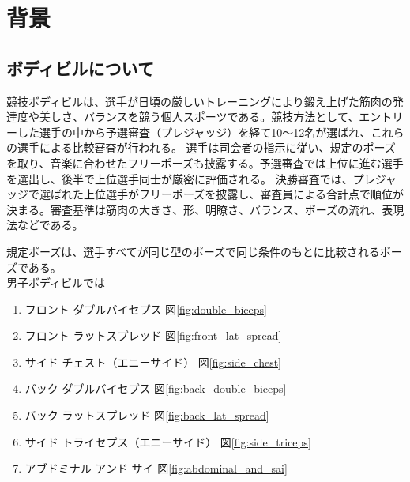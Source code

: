 \chapter{背景}
\label{background}
\section{ボディビルについて}

競技ボディビルは、選手が日頃の厳しいトレーニングにより鍛え上げた筋肉の発達度や美しさ、バランスを競う個人スポーツである。競技方法として、エントリーした選手の中から予選審査（プレジャッジ）を経て10～12名が選ばれ、これらの選手による比較審査が行われる。
選手は司会者の指示に従い、規定のポーズを取り、音楽に合わせたフリーポーズも披露する。予選審査では上位に進む選手を選出し、後半で上位選手同士が厳密に評価される。
決勝審査では、プレジャッジで選ばれた上位選手がフリーポーズを披露し、審査員による合計点で順位が決まる。\cite{bodybuilding}審査基準は筋肉の大きさ、形、明瞭さ、バランス、ポーズの流れ、表現法などである。

規定ポーズは、選手すべてが同じ型のポーズで同じ条件のもとに比較されるポーズである。\cite{posing_performance_jbbf} \\
男子ボディビルでは
\begin{enumerate}
    \item フロント ダブルバイセプス 図\ref{fig:double_biceps}
    \item フロント ラットスプレッド 図\ref{fig:front_lat_spread}
    \item サイド チェスト（エニーサイド） 図\ref{fig:side_chest}
    \item バック ダブルバイセプス 図\ref{fig:back_double_biceps}
    \item バック ラットスプレッド 図\ref{fig:back_lat_spread}
    \item サイド トライセプス（エニーサイド） 図\ref{fig:side_triceps}
    \item アブドミナル アンド サイ 図\ref{fig:abdominal_and_sai}
\end{enumerate}

